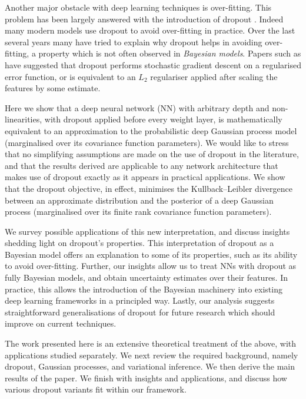 \documentclass{article} %
\theoremstyle{definition}
\begin{document}
Another major obstacle with deep learning techniques is over-fitting. This problem has been largely answered with the introduction of dropout \citep{hinton2012improving,srivastava2014dropout}. Indeed many modern models use dropout to avoid over-fitting in practice. Over the last several years many have tried to explain why dropout helps in avoiding over-fitting, a property which is not often observed in \textit{Bayesian models}. Papers such as \citep{wager2013dropout,baldi2013understanding} have suggested that dropout performs stochastic
gradient descent on a regularised error function, or is equivalent to an $L_2$ regulariser applied after scaling the features by some estimate.

Here we show that a deep neural network (NN) with arbitrary depth and non-linearities, with dropout applied before every weight layer, is mathematically equivalent to an approximation to the probabilistic deep Gaussian process model \citep{damianou2013deep} (marginalised over its covariance function parameters). We would like to stress that no simplifying assumptions are made on the use of dropout in the literature, and that the results derived are applicable to any network architecture that makes use of dropout exactly as it appears in practical applications. We show that the dropout objective, in effect, minimises the Kullback--Leibler divergence between an approximate distribution and the posterior of a deep Gaussian process (marginalised over its finite rank covariance function parameters). 

We survey possible applications of this new interpretation, and discuss insights shedding light on dropout's properties. 
This interpretation of dropout as a Bayesian model offers an explanation to some of its properties, such as its ability to avoid over-fitting. Further, our insights allow us to treat NNs with dropout as fully Bayesian models, and obtain uncertainty estimates over their features. In practice, this allows the introduction of the Bayesian machinery into existing deep learning frameworks in a principled way.
Lastly, our analysis suggests straightforward generalisations of dropout for future research which should improve on current techniques.

The work presented here is an extensive theoretical treatment of the above, with applications studied separately. 
We next review the required background, namely dropout, Gaussian processes, and variational inference. We then derive the main results of the paper. We finish with insights and applications, and discuss how various dropout variants fit within our framework.
\end{document}
